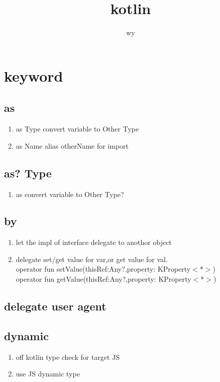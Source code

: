 \documentclass{article}
\begin{document}
\title{kotlin }
\author{wy}
\maketitle

\newpage
\tableofcontents
\newpage 

\section{keyword}
    \subsection{as}
         \begin{enumerate}
            \item as Type  convert variable to Other Type  
            \item as Name  alias otherName for import
         \end{enumerate}
    \subsection{as? Type}
         \begin{enumerate}
            \item as  convert variable to Other Type?  
         \end{enumerate}
    \subsection{by}
         \begin{enumerate}
             \item let the impl of interface delegate to anothor object
             \item delegate set/get value for var,or get value for val.\\
                 operator fun setValue(thisRef:Any$?$,property: KProperty$<$*$>$)\\
                 operator fun getValue(thisRef:Any$?$,property: KProperty$<$*$>$)   
         \end{enumerate}
    \subsection{delegate user agent}
    
    \subsection{dynamic} 
         \begin{enumerate}
             \item off kotlin type check for target JS
             \item use JS dynamic type
         \end{enumerate}
\end{document}
